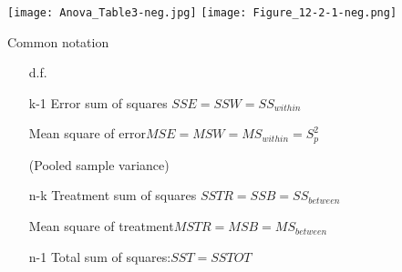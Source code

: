 \begin{frame}
	\centering
	\texttt{[image: Anova\_Table3-neg.jpg]}
	\vfill
	\texttt{[image: Figure\_12-2-1-neg.png]}
\end{frame}
\begin{frame}{Common notation}

\begin{enumerate}
	\item[d.f.\hspace{1.2em}]\phantom{a}\\[2em]
	\item[k-1\hspace{1.2em}]  Error sum of squares \hfill $SSE = SSW = SS_{within}$
	\item[] Mean square of error\hfill $MSE=MSW=MS_{within}=S_p^2$
	\item[] (Pooled sample variance)
		\vfill
	\item[n-k\hspace{1.2em}] Treatment sum of squares \hfill $SSTR = SSB = SS_{between}$
	\item[] Mean square of treatment\hfill $MSTR = MSB=MS_{between}$
		\vfill
	\item[n-1\hspace{1.2em}] Total sum of squares:\hfill $SST = SSTOT$
\end{enumerate}
\end{frame}
